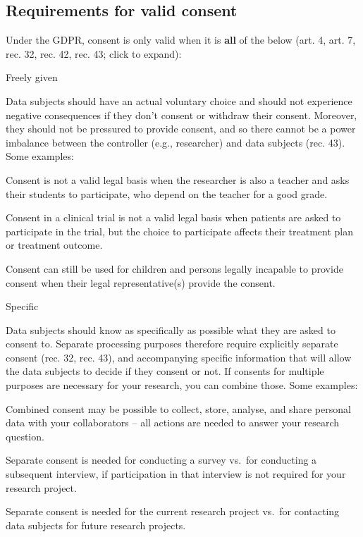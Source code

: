 \documentclass[
]{book}
\begin{document}
\hypertarget{consent-requirements}{%
\subsection{Requirements for valid consent}\label{consent-requirements}}

Under the GDPR, consent is only valid when it is \textbf{all} of the below
(art. 4,
art. 7,
rec. 32,
rec. 42,
rec. 43;
click to expand):

Freely given

Data subjects should have an actual voluntary choice and should not experience
negative consequences if they don't consent or withdraw their consent. Moreover,
they should not be pressured to provide consent, and so there cannot be a power
imbalance between the controller (e.g., researcher) and data subjects
(rec. 43).
Some examples:

Consent is not a valid legal basis when the researcher is also a
teacher and asks their students to participate, who depend on the teacher
for a good grade.

Consent in a clinical trial is not a valid legal basis when patients
are asked to participate in the trial, but the choice to participate
affects their treatment plan or treatment outcome.

Consent can still be used for children and persons legally incapable to
provide consent when their legal representative(s) provide the consent.

Specific

Data subjects should know as specifically as possible what they are asked to
consent to. Separate processing purposes therefore require explicitly separate
consent (rec. 32,
rec. 43), and
accompanying specific information that will allow the data subjects to decide
if they consent or not. If consents for multiple purposes are necessary for your
research, you can combine those.
Some examples:

Combined consent may be possible to collect, store, analyse, and share
personal data with your collaborators -- all actions are needed to answer your
research question.

Separate consent is needed for conducting a survey vs.~for conducting a
subsequent interview, if participation in that interview is not required for
your research project.

Separate consent is needed for the current research project vs.~for contacting
data subjects for future research projects.
\end{document}
